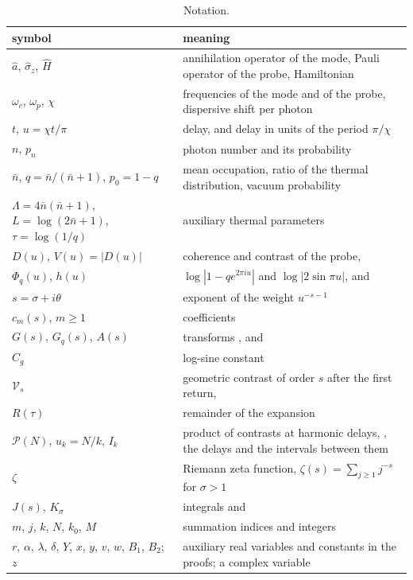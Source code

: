 \documentclass[11pt,reqno]{amsart}
\makeatletter
\let\CG@origeqref\eqref
\newcommand{\CG@gettip}[1]{\@ifundefined{CGTip@#1}{Reference: #1}{\csname CGTip@#1\endcsname}}
\DeclareRobustCommand{\CGeqref}[1]{\pdftooltip{\CG@origeqref{#1}}{\CG@gettip{#1}}}
\numberwithin{equation}{section}
\theoremstyle{plain}
\theoremstyle{definition}
\theoremstyle{remark}
\makeatother
\begin{document}
\begin{table}[!htb]
\caption{Notation.}\label{tab:notation}
\small
\begin{tabular}{p{}p{}}
\toprule
symbol & meaning\\
\midrule
$\hat a$, $\hat\sigma_z$, $\hat H$ & annihilation operator of the mode, Pauli operator of the probe, Hamiltonian \CGeqref{eq:H}\\
$\omega_c$, $\omega_p$, $\chi$ & frequencies of the mode and of the probe, dispersive shift per photon\\
$t$, $u=\chi t/\pi$ & delay, and delay in units of the period $\pi/\chi$\\
$n$, $p_n$ & photon number and its probability \CGeqref{eq:pn}\\
$\bar n$, $q=\bar n/(\bar n+1)$, $p_0=1-q$ & mean occupation, ratio of the thermal distribution, vacuum probability\\
$\Lambda=4\bar n(\bar n+1)$, $L=\log(2\bar n+1)$, $\tau=\log(1/q)$ & auxiliary thermal parameters\\
$D(u)$, $V(u)=|D(u)|$ & coherence and contrast of the probe, \CGeqref{eq:D}\\
$\Phi_q(u)$, $h(u)$ & $\log|1-qe^{2\pi iu}|$ and $\log|2\sin\pi u|$, \CGeqref{eq:logV} and \CGeqref{eq:G}\\
$s=\sigma+i\theta$ & exponent of the weight $u^{-s-1}$\\
$c_m(s)$, $m\ge1$ & coefficients \CGeqref{eq:cm}\\
$G(s)$, $G_q(s)$, $A(s)$ & transforms \CGeqref{eq:G}, \CGeqref{eq:Gq} and \CGeqref{eq:A}\\
$C_g$ & log-sine constant \CGeqref{eq:Cg}\\
$\mathcal V_s$ & geometric contrast of order $s$ after the first return, \CGeqref{eq:Vs}\\
$R(\tau)$ & remainder of the expansion \CGeqref{eq:hot}\\
$\mathcal P(N)$, $u_k=N/k$, $I_k$ & product of contrasts at harmonic delays, \CGeqref{eq:PN}, the delays and the intervals between them\\
$\zeta$ & Riemann zeta function, $\zeta(s)=\sum_{j\ge1}j^{-s}$ for $\sigma>1$\\
$J(s)$, $K_\sigma$ & integrals \CGeqref{eq:J} and \CGeqref{eq:Ksigma}\\
$m$, $j$, $k$, $N$, $k_0$, $M$ & summation indices and integers\\
$r$, $\alpha$, $\lambda$, $\delta$, $Y$, $x$, $y$, $v$, $w$, $B_1$, $B_2$; $z$ & auxiliary real variables and constants in the proofs; a complex variable\\
\bottomrule
\end{tabular}
\end{table}
\end{document}
